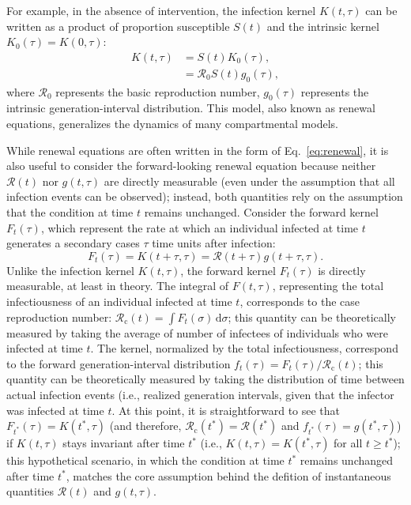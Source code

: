 \documentclass[12pt]{article}
\newcommand{\eref}[1]{Eq.~\ref{eq:#1}}
\newcommand{\Rx}[1]{\ensuremath{{\mathcal R}_{#1}}\xspace}
\newcommand{\Ro}{\Rx{0}}
\newcommand{\Rc}{\Rx{\mathrm{c}}}
\newcommand{\RR}{\ensuremath{{\mathcal R}}\xspace}
\newcommand{\dd}[1]{\ensuremath{\, \mathrm{d}#1}}
\newcommand{\dsigma}{\dd{\sigma}}
\begin{document}
For example, in the absence of intervention, the infection kernel $K(t, \tau)$ can be written as a product of proportion susceptible $S(t)$ and the intrinsic kernel $K_0(\tau) = K(0, \tau)$:
\begin{align}
K(t, \tau) &= S(t) K_0(\tau),\\
&= \Ro S(t) g_0(\tau),
\end{align}
where $\Ro$ represents the basic reproduction number, $g_0(\tau)$ represents the intrinsic generation-interval distribution.
This model, also known as renewal equations, generalizes the dynamics of many compartmental models.

While renewal equations are often written in the form of \eref{renewal}, it is also useful to consider the forward-looking renewal equation because neither $\RR(t)$ nor $g(t, \tau)$ are directly measurable (even under the assumption that all infection events can be observed); instead, both quantities rely on the assumption that the condition at time $t$ remains unchanged.
Consider the forward kernel $F_t(\tau)$, which represent the rate at which an individual infected at time $t$ generates a secondary cases $\tau$ time units after infection: 
\begin{equation}
F_t(\tau) = K(t+\tau, \tau) = \RR(t + \tau) g(t+\tau, \tau).
\label{eq:fkernel}
\end{equation}
Unlike the infection kernel $K(t, \tau)$, the forward kernel $F_t(\tau)$ is directly measurable, at least in theory.
The integral of $F(t, \tau)$, representing the total infectiousness of an individual infected at time $t$, corresponds to the case reproduction number: $\Rc(t) = \int F_t(\sigma) \dsigma$;
this quantity can be theoretically measured by taking the average of number of infectees of individuals who were infected at time $t$. 
The kernel, normalized by the total infectiousness, correspond to the forward generation-interval distribution $f_t(\tau) = F_t(\tau)/\Rc(t)$;
this quantity can be theoretically measured by taking the distribution of time between actual infection events (i.e., realized generation intervals, given that the infector was infected at time $t$.
At this point, it is straightforward to see that $F_{t^\ast}(\tau) = K(t^\ast, \tau)$ (and therefore, $\Rc(t^\ast) = \RR(t^\ast)$ and $f_{t^\ast}(\tau) = g(t^\ast,\tau)$) if $K(t, \tau)$ stays invariant after time $t^\ast$ (i.e., $K(t, \tau) = K(t^\ast, \tau)$ for all $t \geq t^\ast$); this hypothetical scenario, in which the condition at time $t^\ast$ remains unchanged after time $t^\ast$, matches the core assumption behind the defition of instantaneous quantities $\RR(t)$ and $g(t, \tau)$.
\end{document}
